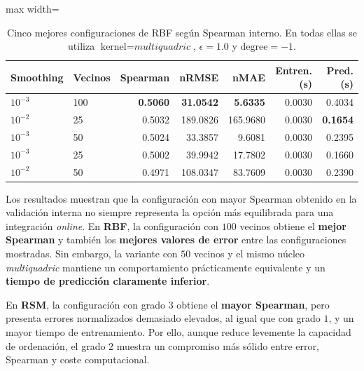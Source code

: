 \begin{table}[H]
    \centering
    \small
    \setlength{\tabcolsep}{4pt}
    \begin{adjustbox}{max width=\textwidth}
        \begin{tabular}{ll|rrrrr}
            \toprule
            \textbf{Smoothing} & \textbf{Vecinos} & \textbf{Spearman} & \textbf{nRMSE}   & \textbf{nMAE}   & \textbf{Entren. (s)} & \textbf{Pred. (s)} \\
            \midrule
            \(10^{-3}\)        & 100              & \textbf{0.5060}   & \textbf{31.0542} & \textbf{5.6335} & 0.0030               & 0.4034             \\
            \(10^{-2}\)        & 25               & 0.5032            & 189.0826         & 165.9680        & 0.0030               & \textbf{0.1654}    \\
            \(10^{-3}\)        & 50               & 0.5024            & 33.3857          & 9.6081          & 0.0030               & 0.2395             \\
            \(10^{-3}\)        & 25               & 0.5002            & 39.9942          & 17.7802         & 0.0030               & 0.1660             \\
            \(10^{-2}\)        & 50               & 0.4971            & 108.0347         & 83.7609         & 0.0030               & 0.2390             \\
            \bottomrule
        \end{tabular}
    \end{adjustbox}
    \caption[Cinco mejores configuraciones de RBF según Spearman interno.]{Cinco mejores configuraciones de RBF según Spearman interno. En todas ellas se utiliza \(\text{kernel}=\textit{multiquadric}\), \(\epsilon=1.0\) y \(\text{degree}=-1\).}
    \label{tab:ajuste_interno_rbf}
\end{table}

Los resultados muestran que la configuración con mayor Spearman obtenido en la validación interna no siempre representa la opción más equilibrada para una integración \textit{online}. En \textbf{RBF}, la configuración con \(100\) vecinos obtiene el \textbf{mejor Spearman} y también los \textbf{mejores valores de error} entre las configuraciones mostradas. Sin embargo, la variante con \(50\) vecinos y el mismo núcleo \textit{multiquadric} mantiene un comportamiento prácticamente equivalente y un \textbf{tiempo de predicción claramente inferior}.

En \textbf{RSM}, la configuración con grado \(3\) obtiene el \textbf{mayor Spearman}, pero presenta errores normalizados demasiado elevados, al igual que con grado \(1\), y un mayor tiempo de entrenamiento. Por ello, aunque reduce levemente la capacidad de ordenación, el grado \(2\) muestra un compromiso más sólido entre error, Spearman y coste computacional.


